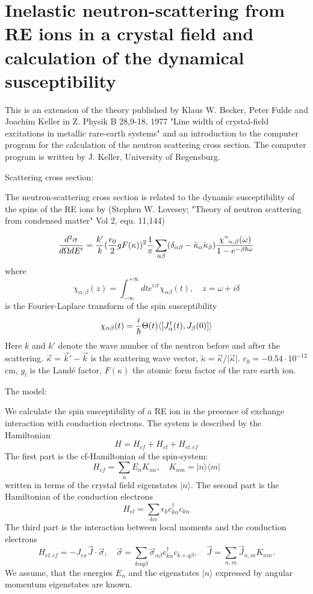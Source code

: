 

%

\section{Inelastic neutron-scattering from RE ions in a crystal field
and calculation of the dynamical susceptibility}

\bigskip
This is an extension  of the theory published by Klaus W. Becker, Peter Fulde and
Joachim Keller in Z. Physik B
28,9-18, 1977 
"Line width of crystal-field excitations in metallic rare-earth systems"
and an  introduction to the computer program for the calculation of  the neutron 
scattering cross section. The computer program is written by J. Keller,
University of Regensburg.

\medskip

\noindent
Scattering cross section:
 
The neutron-scattering cross section is related to the dynamic susceptibility
of the spins of    the RE ions by 
(Stephen W. Lovesey; "Theory of neutron 
scattering from condensed matter"
Vol 2, equ. 11,144)



$$
{d^2\sigma \over d\Omega d E'}=  {k' \over
k}({r_0\over 2}g F(\kappa))^2{1\over \pi }
\sum_{\alpha\beta}(\delta_{\alpha\beta} 
- \hat \kappa_\alpha \hat \kappa_\beta)
{ \chi{"}_{\alpha,\beta}(\omega)\over 1-e^{-\beta \hbar \omega}} 
$$
where
$$
\chi_{\alpha,\beta}(z)=\int_{-\infty}^{+\infty} dt e^{izt}\chi_{\alpha\beta}(t), \quad z=\omega
+i\delta 
$$
is the Fourier-Laplace transform of the spin susceptibility
$$
\chi_{\alpha\beta}(t)={i\over \hbar} \Theta(t)\langle [J^\dagger_\alpha(t), J_\beta(0)]\rangle 
$$
Here $k$ and
$ k'$ denote the  wave number of the neutron before and after the
scattering. $\vec \kappa = \vec k' - \vec k$ is the scattering wave vector,
$\tilde \kappa = \vec \kappa/\vert\vec\kappa\vert$. 
$r_0= -0.54 \cdot 10^{-12}$ cm, $g_l$ is the Land\'e factor, 
$F(\kappa)$ the atomic form factor of the
rare earth ion.
  
\bigskip
\noindent
The model:

We calculate the spin susceptibility of a RE ion in the presence of exchange
interaction with conduction electrons. The system is described by the
Hamiltonian
$$
H=H_{cf}+H_{el}+H_{el,cf} 
$$
The first part is the cf-Hamiltonian of the spin-system: 
$$ 
H_{cf}= \sum_n E_n K_{nn}, \quad K_{nm}= \vert n\rangle \langle m\vert
$$  
written in terms of the crystal field eigenstates $\vert n\rangle$. 
The second part is the Hamiltonian of the conduction electrons
$$
H_{el}=\sum_{k\alpha}\epsilon_kc^\dagger_{k\alpha}c_{k\alpha}
$$
The third part is the 
 interaction between local moments and  the conduction electrons
$$
H_{el,cf}= - J_{ex}\vec J \cdot \vec \sigma, \quad \vec \sigma = \sum_{k\alpha
q\beta}\vec \sigma_{\alpha\beta}c^\dagger_{k\alpha}c_{k+q\beta}, \quad \vec
J=\sum_{n,m}\vec J_{n,m}K_{nm}.
$$
We assume, that the energies $E_n$ and the eigenstates $\vert n\rangle$
expressed by angular momentum eigenstates are known.

